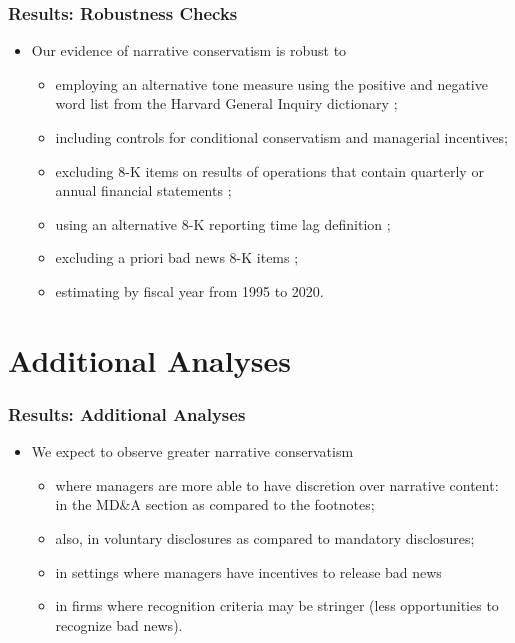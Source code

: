 \documentclass{beamer}
\begin{document}
\begin{frame}
	\frametitle{Results: Robustness Checks}
\begin{itemize}
	\item Our evidence of narrative conservatism is robust to 
	\begin{itemize}
		\item employing an alternative tone measure using the positive and negative word list from the Harvard General Inquiry dictionary \citep{loughranTextualAnalysisAccounting2016};
		\item including controls for conditional conservatism and managerial incentives;
		\item excluding 8-K items on results of operations that contain quarterly or annual financial statements \citep{segalAreManagersStrategic2016};
		\item using an alternative 8-K reporting time lag definition \citep{carterRelevanceForm8K1999, niessnerStrategicDisclosureTiming2015, chapmanInformationOverloadDisclosure2019};
		\item excluding a priori bad news 8-K items \citep{segalAreManagersStrategic2016};
		\item estimating by fiscal year from 1995 to 2020.
	\end{itemize}
\end{itemize}
\end{frame}
\section{Additional Analyses}
\begin{frame}
\frametitle{Results: Additional Analyses}
\begin{itemize}
	\item We expect to observe greater narrative conservatism
	\begin{itemize}
		\item where managers are more able to have discretion over narrative content: in the MD\&A section as compared to the footnotes;
		\item also, in voluntary disclosures as compared to mandatory disclosures;
		\item in settings where managers have incentives to release bad news
		\item in firms where recognition criteria may be stringer (less opportunities to recognize bad news).
	\end{itemize}
\end{itemize}
\end{frame}
\end{document}
